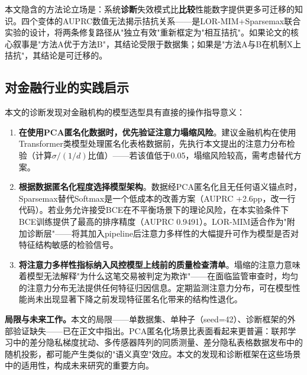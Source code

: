 本文隐含的方法论立场是：系统\textbf{诊断}失效模式比\textbf{比较}性能数字提供更多可迁移的知识。四个变体的AUPRC数值无法揭示拮抗关系——是LOR-MIM+Sparsemax联合实验的设计，将两条修复路径从"独立有效"重新框定为"相互拮抗"。如果论文的核心叙事是"方法A优于方法B"，其结论受限于数据集；如果是"方法A与B在机制X上拮抗"，其结论是可迁移的。

\subsection{对金融行业的实践启示}

本文的诊断发现对金融机构的模型选型具有直接的操作指导意义：

\begin{enumerate}
    \item \textbf{在使用PCA匿名化数据时，优先验证注意力塌缩风险}。建议金融机构在使用Transformer类模型处理匿名化表格数据前，先执行本文提出的注意力分布检验（计算$\sigma/(1/d)$比值）——若该值低于0.05，塌缩风险较高，需考虑替代方案。
    \item \textbf{根据数据匿名化程度选择模型架构}。数据经PCA匿名化且无任何语义锚点时，Sparsemax替代Softmax是一个低成本的改善方案（AUPRC +2.6pp，改一行代码）。若业务允许接受BCE在不平衡场景下的理论风险，在本实验条件下BCE训练提供了最高的排序精度（AUPRC 0.9491）。LOR-MIM适合作为"附加诊断层"——将其加入pipeline后注意力多样性的大幅提升可作为模型是否对特征结构敏感的检验信号。
    \item \textbf{将注意力多样性指标纳入风控模型上线前的质量检查清单}。塌缩的注意力意味着模型无法解释"为什么这笔交易被判定为欺诈"——在面临监管审查时，均匀的注意力分布无法提供任何特征归因信息。定期监测注意力分布，可在模型性能尚未出现显著下降之前发现特征匿名化带来的结构性退化。
\end{enumerate}

\textbf{局限与未来工作。}本文的局限——单数据集、单种子（seed=42）、诊断框架的外部验证缺失——已在正文中指出。PCA匿名化场景比表面看起来更普遍：联邦学习中的差分隐私梯度扰动、多传感器阵列的同质测量、差分隐私表格数据发布中的随机投影，都可能产生类似的"语义真空"效应。本文的发现和诊断框架在这些场景中的适用性，构成未来研究的重要方向。
